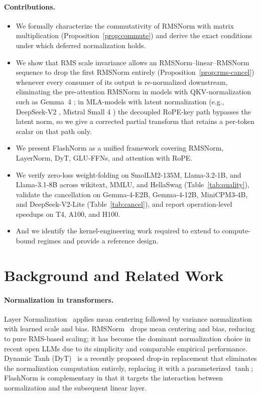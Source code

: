 \documentclass{article}
\begin{document}
\paragraph{Contributions.}
\begin{itemize}
  \item We formally characterize the commutativity of RMSNorm with
        matrix multiplication (Proposition~\ref{prop:commute}) and derive
        the exact conditions under which deferred normalization holds.
  \item We show that RMS scale invariance allows an RMSNorm--linear--RMSNorm
        sequence to drop the first RMSNorm entirely (Proposition~\ref{prop:rms-cancel})
        whenever every consumer of its output is re-normalized downstream,
        eliminating the pre-attention RMSNorm in models with QKV-normalization \citep{qkv-norm}
        such as Gemma~4 \citep{gemma4}; in MLA-models with latent normalization
        (e.g., DeepSeek-V2 \citep{deepseek-v2}, Mistral Small 4 \citep{mistral4})
        the decoupled RoPE-key path bypasses the latent norm, so we give a corrected
        partial transform that retains a per-token scalar on that path only.
  \item We present FlashNorm as a unified framework covering RMSNorm, LayerNorm,
        DyT, GLU-FFNs, and attention with RoPE.
  \item We verify zero-loss weight-folding on SmolLM2-135M, Llama-3.2-1B, and
        Llama-3.1-8B across wikitext, MMLU, and HellaSwag (Table~\ref{tab:quality}),
        validate the cancellation on Gemma-4-E2B, Gemma-4-12B, MiniCPM3-4B, and
        DeepSeek-V2-Lite (Table~\ref{tab:cancel}), and report operation-level
        speedups on T4, A100, and H100.
  \item And we identify the kernel-engineering work required to extend to
        compute-bound regimes and provide a reference design.
\end{itemize}

\section{Background and Related Work}

\paragraph{Normalization in transformers.}
Layer Normalization~\citep{layerNorm} applies mean centering followed by
variance normalization with learned scale and bias. RMSNorm~\citep{rms}
drops mean centering and bias, reducing to pure RMS-based scaling; it has become the
dominant normalization choice in recent open LLMs due to its simplicity and
comparable empirical performance. Dynamic Tanh (DyT)~\citep{DyT} is a
recently proposed drop-in replacement that eliminates the normalization computation
entirely, replacing it with a parameterized $\tanh$; FlashNorm is complementary in
that it targets the interaction between normalization and the subsequent linear layer.
\end{document}
